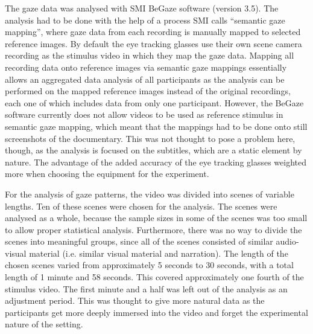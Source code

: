 \documentclass[output=paper]{langsci/langscibook}
\begin{document}
The gaze data was analysed with SMI BeGaze software (version 3.5). The analysis had to be done with the help of a process SMI calls “semantic gaze mapping”, where gaze data from each recording is manually mapped to selected reference images. By default the eye tracking glasses use their own scene camera recording as the stimulus video in which they map the gaze data. Mapping all recording data onto reference images via semantic gaze mappings essentially allows an aggregated data analysis of all participants as the analysis can be performed on the mapped reference images instead of the original recordings, each one of which includes data from only one participant. However, the BeGaze software currently does not allow videos to be used as reference stimulus in semantic gaze mapping, which meant that the mappings had to be done onto still screenshots of the documentary. This was not thought to pose a problem here, though, as the analysis is focused on the subtitles, which are a static element by nature. The advantage of the added accuracy of the eye tracking glasses weighted more when choosing the equipment for the experiment.

For the analysis of gaze patterns, the video was divided into scenes of variable lengths. Ten of these scenes were chosen for the analysis. The scenes were analysed as a whole, because the sample sizes in some of the scenes was too small to allow proper statistical analysis. Furthermore, there was no way to divide the scenes into meaningful groups, since all of the scenes consisted of similar audio-visual material (i.e. similar visual material and narration). The length of the chosen scenes varied from approximately 5 seconds to 30 seconds, with a total length of 1 minute and 58 seconds. This covered approximately one fourth of the stimulus video. The first minute and a half was left out of the analysis as an adjustment period. This was thought to give more natural data as the participants get more deeply immersed into the video and forget the experimental nature of the setting. 
\end{document}
